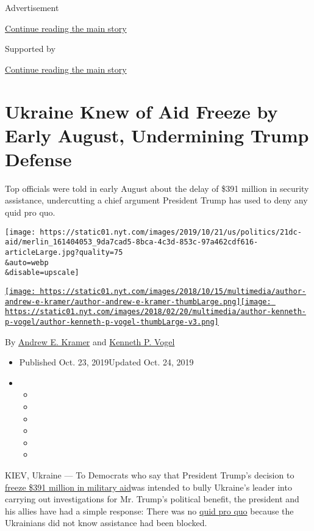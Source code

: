 Advertisement

\protect\hyperlink{after-top}{Continue reading the main story}

Supported by

\protect\hyperlink{after-sponsor}{Continue reading the main story}

\hypertarget{ukraine-knew-of-aid-freeze-by-early-august-undermining-trump-defense}{%
\section{Ukraine Knew of Aid Freeze by Early August, Undermining Trump
Defense}\label{ukraine-knew-of-aid-freeze-by-early-august-undermining-trump-defense}}

Top officials were told in early August about the delay of \$391 million
in security assistance, undercutting a chief argument President Trump
has used to deny any quid pro quo.

\texttt{[image: https://static01.nyt.com/images/2019/10/21/us/politics/21dc-aid/merlin\_161404053\_9da7cad5-8bca-4c3d-853c-97a462cdf616-articleLarge.jpg?quality=75\\\&auto=webp\\\&disable=upscale]}

\href{https://www.nytimes.com/by/andrew-e-kramer}{\texttt{[image: https://static01.nyt.com/images/2018/10/15/multimedia/author-andrew-e-kramer/author-andrew-e-kramer-thumbLarge.png]}}\href{https://www.nytimes.com/by/kenneth-p-vogel}{\texttt{[image: https://static01.nyt.com/images/2018/02/20/multimedia/author-kenneth-p-vogel/author-kenneth-p-vogel-thumbLarge-v3.png]}}

By \href{https://www.nytimes.com/by/andrew-e-kramer}{Andrew E. Kramer}
and \href{https://www.nytimes.com/by/kenneth-p-vogel}{Kenneth P. Vogel}

\begin{itemize}
\item
  Published Oct. 23, 2019Updated Oct. 24, 2019
\item
  \begin{itemize}
  \item
  \item
  \item
  \item
  \item
  \item
  \end{itemize}
\end{itemize}

KIEV, Ukraine --- To Democrats who say that President Trump's decision
to
\href{https://www.nytimes.com/2019/10/24/world/europe/ukraine-war-impeachment.html}{freeze
\$391 million in military aid}was intended to bully Ukraine's leader
into carrying out investigations for Mr. Trump's political benefit, the
president and his allies have had a simple response: There was no
\href{https://www.nytimes.com/2019/10/18/us/politics/quid-pro-quo-mean.html}{quid
pro quo} because the Ukrainians did not know assistance had been
blocked.

